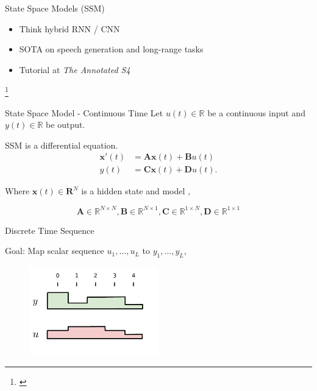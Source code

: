 \documentclass[14pt,aspectratio=169]{beamer}
\newcommand\blfootnote[1]{%
\begingroup
\renewcommand\thefootnote{}\footnote{#1}%
\addtocounter{footnote}{-1}%
\endgroup
}
\begin{document}
\begin{frame}{State Space Models (SSM)}
    \begin{itemize}
        
        \item Think hybrid RNN / CNN 
        
        \item SOTA on speech generation and long-range tasks 

        \item Tutorial at \textit{The Annotated S4}
    \end{itemize}

    \blfootnote{\cite{gu2020hippo,gu2021combining,gu2021efficiently}}
\end{frame}


\begin{frame}{State Space Model - Continuous Time}
    Let $u(t) \in \mathbb{R}$ be a continuous input and $y(t) \in \mathbb{R}$ be output. 

\pause
\vspace{0.5cm}

SSM is a differential equation.
\begin{align*}
    \boldsymbol{x}'(t) &= \boldsymbol{A}\boldsymbol{x}(t) + \boldsymbol{B}u(t) \\  
    y(t) &= \boldsymbol{C}\boldsymbol{x}(t) + \boldsymbol{D}u(t).
\end{align*}

\pause 
Where $\boldsymbol{x}(t) \in \mathbf{R}^N$ is a hidden state and model ,

$$\boldsymbol{A} \in \mathbb{R}^{N\times N}, \boldsymbol{B}\in \mathbb{R}^{N \times 1}, \boldsymbol{C} \in \mathbb{R}^{1 \times N}, \boldsymbol{D} \in \mathbb{R}^{1\times 1}$$

\end{frame}
\begin{frame}{Discrete Time Sequence}

Goal: Map scalar sequence $u_{1}, \ldots, u_L$ to $y_1, \ldots, y_L$,

\begin{figure}
    \centering
    \includegraphics[width=0.5\textwidth]{Figs/SSMStart.pdf}
    \label{fig:my_label}
\end{figure}
\end{frame}
\end{document}

